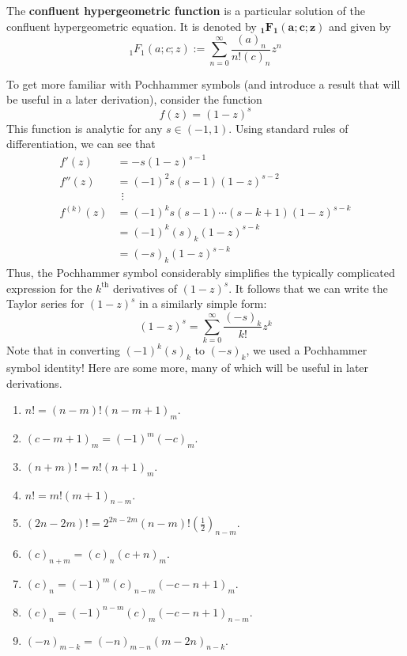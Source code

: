 \documentclass[titlepage]{article}
\numberwithin{equation}{section}
\begin{document}
\begin{definition}
    The \textbf{confluent hypergeometric function} is a particular solution of the confluent hypergeometric equation. It is denoted by $\bm{{}_1F_1(a;c;z)}$ and given by
    \begin{equation*}
        {}_1F_1(a;c;z) := \sum_{n=0}^\infty\frac{(a)_n}{n!(c)_n}z^n
    \end{equation*}
\end{definition}
To get more familiar with Pochhammer symbols (and introduce a result that will be useful in a later derivation), consider the function
\begin{equation*}
    f(z) = (1-z)^s
\end{equation*}
This function is analytic for any $s\in(-1,1)$. Using standard rules of differentiation, we can see that
\begin{align*}
    f'(z) &= -s(1-z)^{s-1}\\
    f''(z) &= (-1)^2s(s-1)(1-z)^{s-2}\\
    &\ \ \vdots\\
    f^{(k)}(z) &= (-1)^ks(s-1)\cdots(s-k+1)(1-z)^{s-k}\\
    &= (-1)^k(s)_k(1-z)^{s-k}\\
    &= (-s)_k(1-z)^{s-k}
\end{align*}
Thus, the Pochhammer symbol considerably simplifies the typically complicated expression for the $k^\text{th}$ derivatives of $(1-z)^s$. It follows that we can write the Taylor series for $(1-z)^s$ in a similarly simple form:
\begin{equation}\label{eqn:1zs}
    (1-z)^s = \sum_{k=0}^\infty\frac{(-s)_k}{k!}z^k
\end{equation}
Note that in converting $(-1)^k(s)_k$ to $(-s)_k$, we used a Pochhammer symbol identity! Here are some more, many of which will be useful in later derivations.
\begin{enumerate}
    \item \label{pci:1}$n!=(n-m)!(n-m+1)_m$.
    \item \label{pci:2}$(c-m+1)_m=(-1)^m(-c)_m$.
    \item \label{pci:3}$(n+m)!=n!(n+1)_m$.
    \item \label{pci:4}$n!=m!(m+1)_{n-m}$.
    \item \label{pci:5}$(2n-2m)!=2^{2n-2m}(n-m)!(\frac{1}{2})_{n-m}$.
    \item \label{pci:6}$(c)_{n+m}=(c)_n(c+n)_m$.
    \item \label{pci:7}$(c)_n=(-1)^m(c)_{n-m}(-c-n+1)_m$.
    \item \label{pci:8}$(c)_n=(-1)^{n-m}(c)_m(-c-n+1)_{n-m}$.
    \item \label{pci:9}$(-n)_{m-k}=(-n)_{m-n}(m-2n)_{n-k}$.
\end{enumerate}
\end{document}
